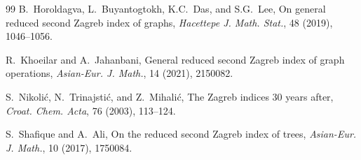 \documentclass[preprint,12pt]{elsarticle}
\begin{document}
\begin{thebibliography}{99}
B.~Horoldagva, L.~Buyantogtokh, K.C.~Das, and S.G.~Lee, On general reduced second Zagreb index of graphs, \emph{Hacettepe J. Math. Stat.}, 48 (2019), 1046–1056.


R.~Khoeilar and A.~Jahanbani, General reduced second Zagreb index of graph operations, \emph{Asian-Eur. J. Math.}, 14 (2021), 2150082.

S.~Nikolić, N.~Trinajstić, and Z.~Mihalić, The Zagreb indices 30 years after, \emph{Croat. Chem. Acta}, 76 (2003), 113–124.

S.~Shafique and A.~Ali,
On the reduced second Zagreb index of trees,
\emph{Asian-Eur. J. Math.}, 10 (2017), 1750084.

\end{thebibliography}
\end{document}
